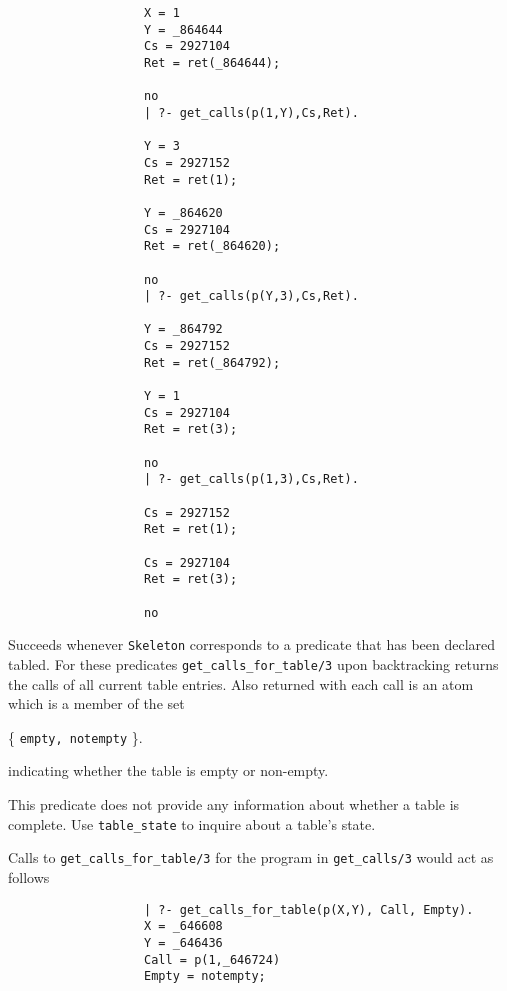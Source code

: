 \begin{description}
{\begin{verbatim}
                   X = 1
                   Y = _864644
                   Cs = 2927104
                   Ret = ret(_864644);

                   no
                   | ?- get_calls(p(1,Y),Cs,Ret).

                   Y = 3
                   Cs = 2927152
                   Ret = ret(1);

                   Y = _864620
                   Cs = 2927104
                   Ret = ret(_864620);

                   no
                   | ?- get_calls(p(Y,3),Cs,Ret).

                   Y = _864792
                   Cs = 2927152
                   Ret = ret(_864792);

                   Y = 1
                   Cs = 2927104
                   Ret = ret(3);

                   no
                   | ?- get_calls(p(1,3),Cs,Ret).

                   Cs = 2927152
                   Ret = ret(1);

                   Cs = 2927104
                   Ret = ret(3);

                   no

	\end{verbatim}
	}

Succeeds whenever {\tt Skeleton} corresponds to a predicate that has been 
declared tabled.  For these predicates {\tt get\_calls\_for\_table/3} 
upon backtracking returns the calls of all current table entries.
Also returned with each call is an atom which is a member of the set
\begin{center}
\{ {\tt empty, notempty} \}.
\end{center}
indicating whether the table is empty or non-empty.  

This predicate does not provide any information about whether a table is
complete.  Use {\tt table\_state} to inquire about a table's state.

\noindent
Calls to {\tt get\_calls\_for\_table/3} for the 
program in {\tt get\_calls/3} would act as follows
    {\footnotesize
     \begin{verbatim}
                   | ?- get_calls_for_table(p(X,Y), Call, Empty).
                   X = _646608
                   Y = _646436
                   Call = p(1,_646724)
                   Empty = notempty;


\end{verbatim}}
\end{description}
